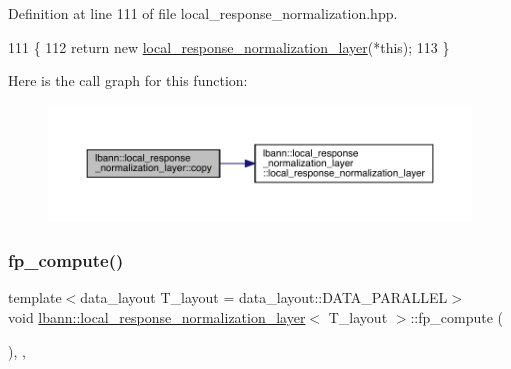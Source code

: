 Definition at line 111 of file local\+\_\+response\+\_\+normalization.\+hpp.


\begin{DoxyCode}
111                                                             \{
112     \textcolor{keywordflow}{return} \textcolor{keyword}{new} \hyperlink{classlbann_1_1local__response__normalization__layer_a5fa2f3175590cc85aa984c42cc9acd95}{local\_response\_normalization\_layer}(*\textcolor{keyword}{this});
113   \}
\end{DoxyCode}
Here is the call graph for this function\+:\nopagebreak
\begin{figure}[H]
\begin{center}
\leavevmode
\includegraphics[width=350pt]{classlbann_1_1local__response__normalization__layer_a2bccec49f9b3840a2d9170cb202c1397_cgraph}
\end{center}
\end{figure}
\mbox{\label{classlbann_1_1local__response__normalization__layer_ac7b2ce4970eb7163685fb0a4a69328fc}} 
\subsubsection{\texorpdfstring{fp\+\_\+compute()}{fp\_compute()}}
{\footnotesize\ttfamily template$<$data\+\_\+layout T\+\_\+layout = data\+\_\+layout\+::\+D\+A\+T\+A\+\_\+\+P\+A\+R\+A\+L\+L\+EL$>$ \\
void \hyperlink{classlbann_1_1local__response__normalization__layer}{lbann\+::local\+\_\+response\+\_\+normalization\+\_\+layer}$<$ T\+\_\+layout $>$\+::fp\+\_\+compute (\begin{DoxyParamCaption}{ }\end{DoxyParamCaption})\hspace{0.3cm}{\ttfamily [inline]}, {\ttfamily [override]}, {\ttfamily [virtual]}}

